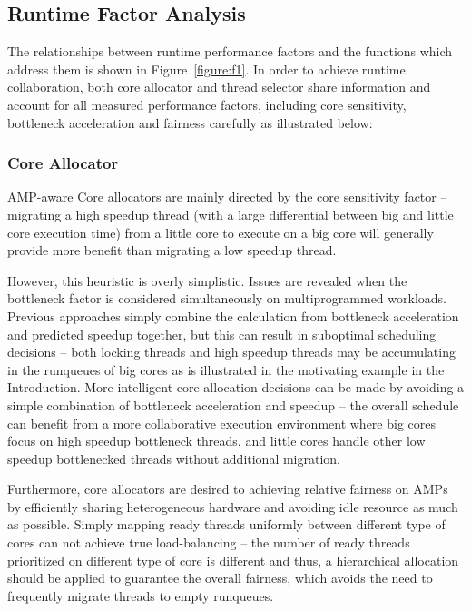 \documentclass[10pt,conference]{IEEEtran}
\begin{document}
\subsection{Runtime Factor Analysis}
The relationships between runtime performance factors and the functions which address them is shown in Figure~\ref{figure:f1}. In order to achieve runtime collaboration, both core allocator and thread selector share information and account for all measured performance factors, including core sensitivity, bottleneck acceleration and fairness carefully as illustrated below:
\subsubsection{Core Allocator}
AMP-aware Core allocators are mainly directed by the core sensitivity factor -- migrating a high speedup thread (with a large differential between big and little core execution time) from  a little core to execute on a big core will generally provide more benefit than migrating a low speedup thread. 

However, this heuristic is overly simplistic. Issues are revealed when the bottleneck factor is considered simultaneously on multiprogrammed workloads. Previous approaches \cite{jibaja2016portable} simply combine the calculation from  bottleneck acceleration and predicted speedup together, but this can result in suboptimal scheduling decisions -- both locking threads and high speedup threads may be accumulating in the runqueues of big cores as is illustrated in the motivating example in the Introduction. More intelligent core allocation decisions can be made by avoiding a simple combination of bottleneck acceleration and speedup -- the overall schedule can benefit from a more collaborative execution environment where big cores focus on high speedup bottleneck threads, and little cores handle other low speedup bottlenecked threads without additional migration.

Furthermore, core allocators are desired to achieving relative fairness on AMPs by efficiently sharing heterogeneous hardware and avoiding idle resource as much as possible. 
Simply mapping ready threads uniformly between different type of cores can not achieve true load-balancing -- the number of ready threads prioritized on different type of core is different and thus, a hierarchical allocation should be applied to guarantee the overall fairness, which avoids the need to frequently migrate threads to empty runqueues. 
\end{document}
